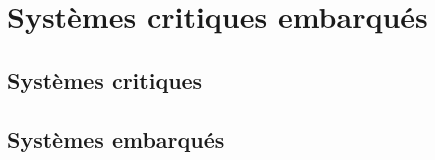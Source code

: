 \section{Systèmes critiques embarqués}
\label{sec:introduction_contexte_systemes}

\subsection{Systèmes critiques}
\subsection{Systèmes embarqués}


